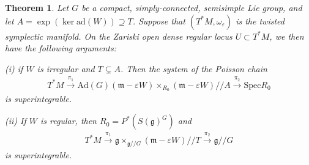 \documentclass[11pt]{amsart}
\newtheorem{theorem}{Theorem}[section]
\theoremstyle{definition}
\theoremstyle{plain}
\theoremstyle{conclusion}
\begin{document}
\begin{theorem}
\label{thm:superin}
Let $G$ be a compact, simply-connected, semisimple Lie group, and let $A=\exp(\ker\mathrm{ad}(W))\supseteq T$. Suppose that $(T^*M,\omega_\varepsilon)$ is the twisted symplectic manifold. On the Zariski open dense regular locus $U \subset T^*M$, we then have the following arguments:

(i) if $W$ is irregular and $T \subsetneq A$. Then the system of the Poisson chain \begin{align}
    T^*M\xrightarrow{\pi_1}\mathrm{Ad}(G)(\mathfrak{m} - \varepsilon W)\times_{R_0}(\mathfrak{m} - \varepsilon W)//A \xrightarrow{\pi_2}\mathrm{Spec} R_0  \label{eq:irr}
\end{align} is superintegrable.

(ii) If $W$ is regular, then $R_0  = P^*\left(S(\mathfrak{g})^G\right)$ and \begin{align}
    T^*M\xrightarrow{\pi_1}  \mathfrak{g}  \times_{\mathfrak{g}//G} (\mathfrak{m} - \varepsilon W)//T \xrightarrow{\pi_2}\mathfrak{g}//G  \label{eq:re}
\end{align} is superintegrable.
\end{theorem}
\end{document}
